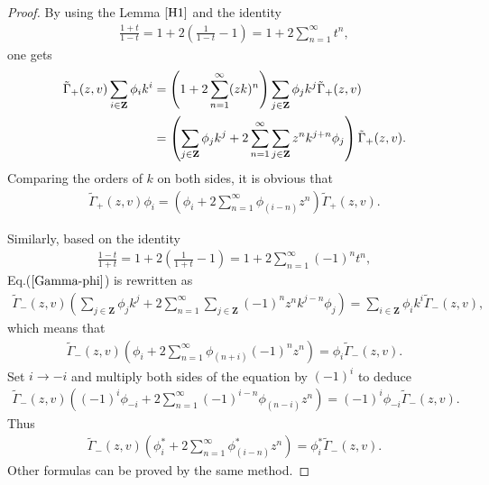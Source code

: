 \documentclass[11pt,reqno]{amsart}
\numberwithin{equation}{section}
\begin{document}
	\begin{proof}
		By using the Lemma $\ref{H1}$ and the identity
		\begin{align}
			\frac{1+t}{1-t}=1+2(\frac{1}{1-t}-1)
			=1+2\sum_{n=1}^{\infty}t^n,
		\end{align}	
		one gets	
		\begin{align}
			\tilde{\Gamma}_+(z,v)
			\sum_{i\in\mathbf{Z}}\phi_{i}k^{i}&=
			\left(1+2\sum_{n=1}^{\infty}(zk)^n\right)
			\sum_{j\in\mathbf{Z}}\phi_{j}k^{j} \tilde{\Gamma}_+(z,v)\notag\\
			&=\left(\sum_{j\in\mathbf{Z}}\phi_{j}k^{j}
			+2\sum_{n=1}^{\infty}\sum_{j\in\mathbf{Z}}  z^n k^{j+n} \phi_{j}
			\right)
			\tilde{\Gamma}_+(z,v).
		\end{align}
		Comparing the orders of $k$ on both sides, it is obvious that
		\begin{align}
			\tilde{\Gamma}_+(z,v)\phi_{i}
			=\left( \phi_i + 2\sum_{n=1}^{\infty} \phi_{(i-n)} z^n \right)
			\tilde{\Gamma}_+(z,v).
		\end{align}
		
		Similarly, based on the identity
		\begin{align}
			\frac{1-t}{1+t}=1+2\left(\frac{1}{1+t}-1\right)
			=1+2\sum_{n=1}^{\infty} (-1)^n t^n,
		\end{align}
		Eq.($\ref{Gamma-phi}$)  is rewritten as
		\begin{align}
			\tilde{\Gamma}_-(z,v)
			\left(\sum_{j\in\mathbf{Z}}\phi_{j}k^{j}
			+2\sum_{n=1}^{\infty}\sum_{j\in\mathbf{Z}}(-1)^n  z^n k^{j-n} \phi_{j}
			\right)
			=\sum_{i\in\mathbf{Z}}\phi_{i}k^{i}  \tilde{\Gamma}_-(z,v),
		\end{align}
		which means that
		\begin{align}
			\tilde{\Gamma}_-(z,v)\left( \phi_i + 2\sum_{n=1}^{\infty}  \phi_{(n+i)} (-1)^{n} z^n \right)	
			=\phi_{i}\tilde{\Gamma}_-(z,v).
		\end{align}
		Set $i\rightarrow -i$ and multiply both sides of the equation by $(-1)^i$ to deduce
		\begin{align}
			\tilde{\Gamma}_-(z,v)\left((-1)^i \phi_{-i} + 2\sum_{n=1}^{\infty}  (-1)^{i-n} \phi_{(n-i)}  z^n \right)	
			=(-1)^i\phi_{-i}\tilde{\Gamma}_-(z,v).
		\end{align}
		Thus
		\begin{align}
			\tilde{\Gamma}_-(z,v)\left( \phi_i^* + 2\sum_{n=1}^{\infty}  \phi_{(i-n)}^*  z^n \right)	
			=\phi_{i}^*\tilde{\Gamma}_-(z,v).
		\end{align}
		Other formulas can be proved by the same method.
	\end{proof}
	
\end{document}
